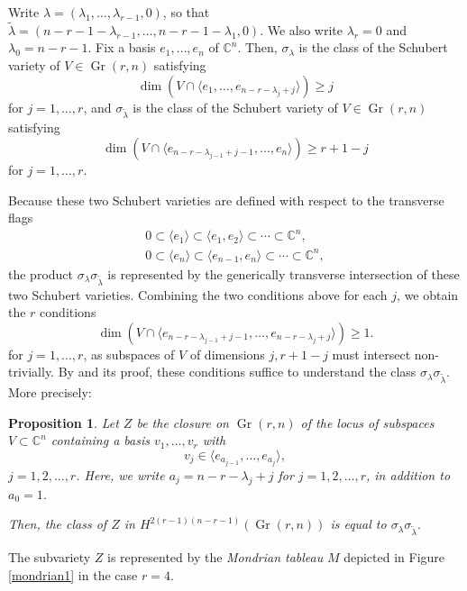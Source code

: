 \documentclass[11pt]{article}
\newtheorem{prop}[theo]{Proposition}
\theoremstyle{definition}
\numberwithin{equation}{section}
\newcommand{\bC}{\mathbb{C}}
\DeclareMathOperator{\Gr}{Gr}
\begin{document}
Write $\lambda=(\lambda_1,\ldots,\lambda_{r-1},0)$, so that $\widetilde{\lambda}=(n-r-1-\lambda_{r-1},\ldots,n-r-1-\lambda_1,0)$. We also write $\lambda_r=0$ and $\lambda_0=n-r-1$. Fix a basis $e_1,\ldots,e_n$ of $\bC^n$. Then, $\sigma_{\lambda}$ is the class of the Schubert variety of $V\in\Gr(r,n)$ satisfying
\begin{equation*}
\dim(V\cap\langle e_1,\ldots,e_{n-r-\lambda_j+j}\rangle)\ge j
\end{equation*}
for $j=1,\ldots,r$, and $\sigma_{\widetilde{\lambda}}$ is the class of the Schubert variety of $V\in\Gr(r,n)$ satisfying
\begin{equation*}
\dim(V\cap\langle e_{n-r-\lambda_{j-1}+j-1},\ldots,e_{n}\rangle)\ge r+1-j
\end{equation*}
for $j=1,\ldots,r$.

Because these two Schubert varieties are defined with respect to the transverse flags
\begin{align*}
0\subset\langle e_1\rangle\subset\langle e_1,e_{2}\rangle\subset\cdots\subset\bC^n,\\
0\subset\langle e_{n}\rangle\subset\langle e_{n-1},e_{n}\rangle\subset\cdots\subset\bC^n,
\end{align*}
the product $\sigma_{\lambda}\sigma_{\widetilde{\lambda}}$ is represented by the generically transverse intersection of these two Schubert varieties. Combining the two conditions above for each $j$, we obtain the $r$ conditions
\begin{equation*}
\dim(V\cap\langle e_{n-r-\lambda_{j-1}+j-1},\ldots,e_{n-r-\lambda_j+j}\rangle)\ge 1.
\end{equation*}
for $j=1,\ldots,r$, as subspaces of $V$ of dimensions $j,r+1-j$ must intersect non-trivially. By \cite[Theorem 3.21]{Cos09} and its proof, these conditions suffice to understand the class $\sigma_\lambda\sigma_{\widetilde{\lambda}}$. More precisely:
\begin{prop}
Let $Z$ be the closure on $\Gr(r,n)$ of the locus of subspaces $V\subset\bC^n$ containing a basis $v_1,\ldots,v_r$ with 
\begin{equation*}
v_j\in \langle e_{a_{j-1}},\ldots,e_{a_j}\rangle,
\end{equation*}
$j=1,2,\ldots,r$. Here, we write $a_j=n-r-\lambda_j+j$ for $j=1,2,\ldots,r$, in addition to $a_0=1$.

Then, the class of $Z$ in $H^{2(r-1)(n-r-1)}(\Gr(r,n))$ is equal to $\sigma_\lambda\sigma_{\widetilde{\lambda}}$.
\end{prop}
The subvariety $Z$ is represented by the \emph{Mondrian tableau} $M$ depicted in Figure \ref{mondrian1} in the case $r=4$.
\end{document}
